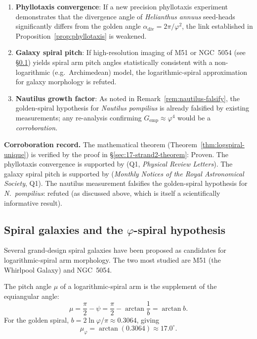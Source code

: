 \begin{enumerate}
  \item \textbf{Phyllotaxis convergence}: If a new precision
    phyllotaxis experiment demonstrates that the divergence
    angle of \textit{Helianthus annuus} seed-heads significantly
    differs from the golden angle \(\alpha_\text{div} =
    2\pi/\varphi^2\), the link established in
    Proposition~\ref{prop:phyllotaxis} is weakened.

  \item \textbf{Galaxy spiral pitch}: If high-resolution imaging
    of M51 or NGC~5054 (see \S\ref{subsec:17-galaxies}) yields
    spiral arm pitch angles statistically consistent with a
    non-logarithmic (e.g.\ Archimedean) model, the logarithmic-spiral
    approximation for galaxy morphology is refuted.

  \item \textbf{Nautilus growth factor}: As noted in
    Remark~\ref{rem:nautilus-falsify}, the golden-spiral
    hypothesis for \textit{Nautilus pompilius} is already
    falsified by existing measurements; any re-analysis
    confirming \(G_{\text{emp}} \approx \varphi^4\) would be
    a \emph{corroboration}.
\end{enumerate}

\textbf{Corroboration record.}  The mathematical theorem
(Theorem~\ref{thm:logspiral-unique}) is verified by the proof
in \S\ref{sec:17-strand2-theorem}: Proven.  The phyllotaxis
convergence is supported by \cite{douady_couder_phyllotaxis}
(Q1, \textit{Physical Review Letters}).  The galaxy
spiral pitch is supported by \cite{seigar_galaxy_pitch}
(\textit{Monthly Notices of the Royal Astronomical Society},
Q1).  The nautilus measurement falsifies the golden-spiral
hypothesis for \textit{N.\ pompilius}: refuted (as discussed
above, which is itself a scientifically informative result).

\subsection{Spiral galaxies and the \(\varphi\)-spiral hypothesis}
\label{subsec:17-galaxies}

Several grand-design spiral galaxies have been proposed as
candidates for logarithmic-spiral arm morphology.  The two most
studied are M51 (the Whirlpool Galaxy) and NGC~5054.

\begin{definition}
\label{def:pitch}
The pitch angle \(\mu\) of a logarithmic-spiral arm is the
supplement of the equiangular angle:
\[
  \mu = \frac{\pi}{2} - \psi = \frac{\pi}{2} - \arctan\frac{1}{b}
      = \arctan b.
\]
For the golden spiral, \(b = 2\ln\varphi/\pi \approx 0.3064\),
giving
\[
  \mu_\varphi = \arctan(0.3064) \approx 17.0^\circ.
\]
\end{definition}

